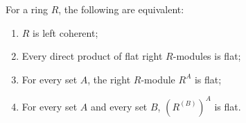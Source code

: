 For a ring $R$, the following are equivalent:
\begin{enumerate}
\item[(a)] $R$ is left coherent;
\item[(b)] Every direct product of flat right $R$-modules is flat;
\item[(c)] For every set $A$, the right $R$-module $R^A$ is flat;
\item[(d)] For every set $A$ and every set $B$, $(R^{(B)})^A$ is flat.
\end{enumerate}
